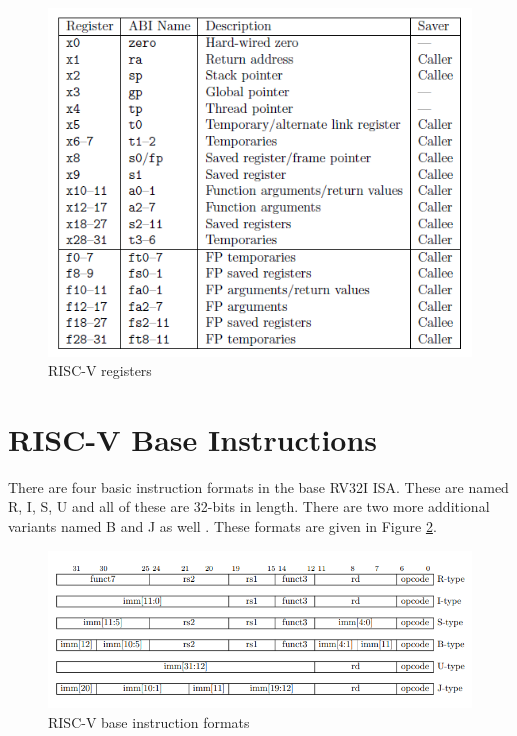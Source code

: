 \begin{figure}[h!]
    \centering
    \includegraphics{riscv/riscv_registers.png}
    \caption{RISC-V registers \cite{rvregisters}}
    \label{fig:riscv_registers}
\end{figure}

\section{RISC-V Base Instructions}
There are four basic instruction formats in the base RV32I ISA. These are named R, I, S, U and all of these are 32-bits in length. There are two more additional variants named B and J as well \cite{rvmanual}. These formats are given in Figure \ref{fig:risc-v_base_instruction_formats}.
\begin{figure}
    \centering
    \includegraphics{riscv/riscv_base_instruction_formats.png}
    \caption{RISC-V base instruction formats \cite{rvmanual}}
    \label{fig:risc-v_base_instruction_formats}
\end{figure}

